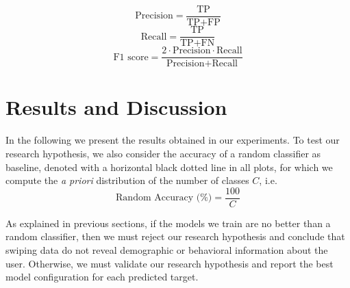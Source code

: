 \documentclass[sn-mathphys, pdflatex]{sn-jnl}
\begin{document}
\begin{equation}\label{eq:precision}
    \text{Precision} = \frac{\text{TP}}{\text{TP} + \text{FP}}
\end{equation}
\begin{equation}\label{eq:recall}
    \text{Recall} = \frac{\text{TP}}{\text{TP} + \text{FN}}
\end{equation}
\begin{equation}\label{eq:fscore}
    \text{F1 score}=  \frac{2 \cdot \text{Precision} \cdot \text{Recall}}{\text{Precision} + \text{Recall}}
\end{equation}


\section{Results and Discussion}
\label{sec:discussion}



In the following we present the results obtained in our experiments.
To test our research hypothesis, we also consider the accuracy of a random classifier as baseline,
denoted with a horizontal black dotted line in all plots,
for which we compute the \emph{a priori} distribution of the number of classes $C$, i.e.
\begin{equation}
    \text{Random Accuracy (\%)} = \frac{100}{C}
\end{equation}

As explained in previous sections, if the models we train are no better than a random classifier,
then we must reject our research hypothesis and conclude that swiping data do not reveal demographic or behavioral information about the user.
Otherwise, we must validate our research hypothesis and report the best model configuration for each predicted target.
\end{document}
